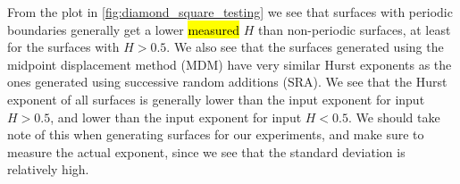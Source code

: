 From the plot in \cref{fig:diamond_square_testing} we see that surfaces with periodic boundaries generally get a lower \hl{measured} $H$ than non-periodic surfaces, at least for the surfaces with $H>0.5$. We also see that the surfaces generated using the midpoint displacement method (MDM) have very similar Hurst exponents as the ones generated using successive random additions (SRA). We see that the Hurst exponent of all surfaces is generally lower than the input exponent for input $H>0.5$, and lower than the input exponent for input $H<0.5$. We should take note of this when generating surfaces for our experiments, and make sure to measure the actual exponent, since we see that the standard deviation is relatively high.
%
%

